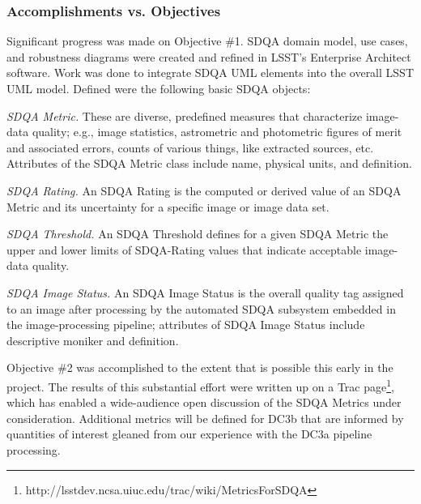 \subsubsection{Accomplishments vs. Objectives}

Significant progress was made on Objective \#1.  SDQA domain model, use cases, 
and robustness diagrams were created and refined in LSST's Enterprise Architect 
software.  Work was done to integrate SDQA UML elements into the overall LSST
UML model.  Defined were the following basic SDQA objects:

\begin{description}
\item{\it SDQA Metric.}
These are diverse, predefined measures that characterize image-data quality; 
e.g., image statistics, astrometric and photometric figures of merit and associated 
errors, counts of various things, like extracted sources, etc.  Attributes of the
SDQA Metric class include name, physical units, and definition.  
\item{\it SDQA Rating.}
An SDQA Rating is 
the computed or derived value of an SDQA Metric and its uncertainty for a specific
image or image data set.  
\item{\it SDQA Threshold.}
An SDQA Threshold defines for a given SDQA Metric the 
upper and lower limits of SDQA-Rating values that indicate acceptable image-data 
quality.  \item{\it SDQA Image Status.}
An SDQA Image Status is the overall quality tag assigned to an image
after processing by the automated SDQA subsystem embedded in the image-processing
pipeline; attributes of SDQA Image Status include descriptive moniker and definition.
\end{description}

Objective \#2 was accomplished to the extent that is possible this early in the 
project.  The results of this substantial effort were written up on a Trac 
page\footnote{http://lsstdev.ncsa.uiuc.edu/trac/wiki/MetricsForSDQA}, which has 
enabled a wide-audience open discussion of the SDQA Metrics under consideration.
Additional metrics will be defined for DC3b that are informed by quantities of interest 
gleaned from our experience with the DC3a pipeline processing.

